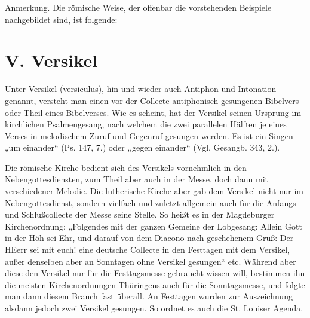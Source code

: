 



Anmerkung. Die römische Weise, der offenbar die vorstehenden Beispiele nachgebildet sind, ist folgende:


\chapter{V. Versikel}


Unter Versikel (versiculus), hin und wieder auch Antiphon und Intonation genannt, versteht man einen vor der Collecte antiphonisch gesungenen Bibelvers oder Theil eines Bibelverses. Wie es scheint, hat der Versikel seinen Ursprung im kirchlichen Psalmengesang, nach welchem die zwei parallelen Hälften je eines Verses in melodischem Zuruf und Gegenruf gesungen werden. Es ist ein Singen „um einander“ (Ps. 147, 7.) oder „gegen einander“ (Vgl. Gesangb. 343, 2.).

Die römische Kirche bedient sich des Versikels vornehmlich in den Nebengottesdiensten, zum Theil aber auch in der Messe, doch dann mit verschiedener Melodie. Die lutherische Kirche aber gab dem Versikel nicht nur im Nebengottesdienst,
sondern vielfach und zuletzt allgemein auch für die Anfangs- und Schlußcollecte der Messe seine Stelle. So heißt es in der Magdeburger Kirchenordnung: „Folgendes mit der ganzen Gemeine der Lobgesang: Allein Gott in der Höh sei Ehr, und darauf von dem Diacono nach geschehenem Gruß: Der HEerr sei mit euch! eine deutsche Collecte in den Festtagen mit dem Versikel, außer denselben aber an Sonntagen ohne Versikel gesungen“ etc. Während aber diese den Versikel nur für die Festtagsmesse gebraucht wissen will, bestimmen ihn die meisten Kirchenordnungen Thüringens auch für die Sonntagsmesse, und folgte man dann diesem Brauch fast überall. An Festtagen wurden zur Auszeichnung alsdann jedoch zwei Versikel gesungen. So ordnet es auch die St. Louiser Agenda.

